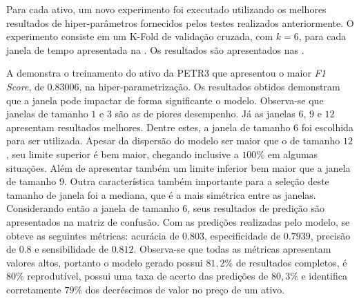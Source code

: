 Para cada ativo, um novo experimento foi executado utilizando os melhores resultados de hiper-parâmetros fornecidos pelos testes realizados anteriormente. O experimento consiste em um K-Fold de validação cruzada, com $k=6$, para cada janela de tempo apresentada na . Os resultados são apresentados nas . 

A  demonstra o treinamento do ativo da PETR3 que apresentou o maior \emph{F1 Score}, de $0.83006$, na hiper-parametrização. Os resultados obtidos demonstram que a janela pode impactar de forma significante o modelo. Observa-se que janelas de tamanho $1$ e $3$ são as de piores desempenho. Já as janelas $6$, $9$ e $12$ apresentam resultados melhores. Dentre estes, a janela de tamanho $6$ foi escolhida para ser utilizada. Apesar da dispersão do modelo ser maior que o de tamanho $12$, seu limite superior é bem maior, chegando inclusive a $100\%$ em algumas situações. Além de apresentar também um limite inferior bem maior que a janela de tamanho $9$. Outra característica também importante para a seleção deste tamanho de janela foi a mediana, que é a mais simétrica entre as janelas. Considerando então a janela de tamanho $6$, seus resultados de predição são apresentados na matriz de confusão. Com as predições realizadas pelo modelo, se obteve as seguintes métricas: acurácia de $0.803$, especificidade de $0.7939$, precisão de $0.8$ e sensibilidade de $0.812$. Observa-se que todas as métricas apresentam valores altos, portanto o modelo gerado possui $81,2\%$ de resultados completos, é $80\%$ reprodutível, possui uma taxa de acerto das predições de $80,3\%$ e identifica corretamente $79\%$ dos decréscimos de valor no preço de um ativo.


